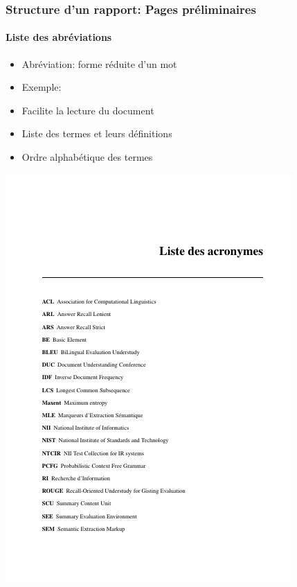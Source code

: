 \documentclass[xcolor=table]{beamer}
\begin{document}
\begin{frame}
\frametitle{Structure d'un rapport: Pages préliminaires}
\framesubtitle{Liste des abréviations}

\begin{minipage}{0.52\textwidth}
	\begin{itemize}
		\item Abréviation: forme réduite d'un mot
		\item Exemple: 
		\item Facilite la lecture du document 
		\item Liste des termes et leurs définitions
		\item Ordre alphabétique des termes
	\end{itemize}
\end{minipage}
\begin{minipage}{0.42\textwidth}
	\includegraphics[width=\textwidth]{..//img/Bweb03-redaction/abbrv-lst.png}
\end{minipage}

\end{frame}
\end{document}
